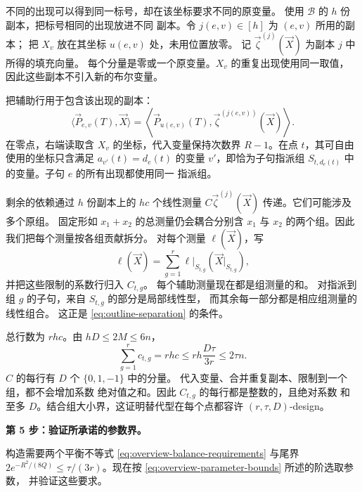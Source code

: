 \documentclass[11pt,reqno]{amsart}
\numberwithin{equation}{section}
\theoremstyle{definition}\newtheorem{definition}[theorem]{定义}
\theoremstyle{remark}\newtheorem{remark}[theorem]{注}
\renewcommand{\le}{\leqslant}
\begin{document}
不同的出现可以得到同一标号，却在该坐标要求不同的原变量。
使用 $\mathcal B$ 的 $h$ 份副本，把标号相同的出现放进不同
副本。令 $j(e,v)\in[h]$ 为 $(e,v)$ 所用的副本；
把 $X_v$ 放在其坐标 $u(e,v)$ 处，未用位置放零。
记 $\vec\zeta^{(j)}(\vec X)$ 为副本 $j$ 中所得的填充向量。
每个分量是零或一个原变量。$X_v$ 的重复出现使用同一取值，
因此这些副本不引入新的布尔变量。

把辅助行用于包含该出现的副本：
\begin{equation}\label{eq:overview-transferred-row}
 \langle\vec P_{e,v}(T),\vec X\rangle
 =\left\langle\vec P_{u(e,v)}(T),
                  \vec\zeta^{(j(e,v))}(\vec X)\right\rangle.
\end{equation}
在零点，右端读取含 $X_v$ 的坐标，代入变量保持次数界
$R-1$。在点 $t$，其可自由使用的坐标只含满足
$a_{v'}(t)=d_e(t)$ 的变量 $v'$，即恰为子句指派组
$S_{t,d_e(t)}$ 中的变量。子句 $e$ 的所有出现都使用同一
指派组。

剩余的依赖通过 $h$ 份副本上的 $hc$ 个线性测量
$C\vec\zeta^{(j)}(\vec X)$ 传递。它们可能涉及多个原组。
固定形如 $x_1+x_2$ 的总测量仍会耦合分别含 $x_1$ 与 $x_2$
的两个组。因此我们把每个测量按各组贡献拆分。
对每个测量 $\ell(\vec X)$，写
\[
 \ell(\vec X)=\sum_{g=1}^r
        \ell|_{S_{t,g}}(\vec X|_{S_{t,g}}),
\]
并把这些限制的系数行归入 $C_{t,g}$。
每个辅助测量现在都是组测量的和。
对指派到组 $g$ 的子句，来自 $S_{t,g}$ 的部分是局部线性型，
而其余每一部分都是相应组测量的线性组合。
这正是 \eqref{eq:outline-separation} 的条件。

总行数为 $rhc$。由 $hD\le2M\le6n$，
\[
 \sum_{g=1}^r c_{t,g}
 =rhc\le rh\frac{D\tau}{3r}\le2\tau n.
\]
$C$ 的每行有 $D$ 个 $\{0,1,-1\}$ 中的分量。
代入变量、合并重复副本、限制到一个组，都不会增加系数
绝对值之和。因此 $C_{t,g}$ 的每行都是整数的，且绝对系数
和至多 $D$。结合组大小界，这证明替代型在每个点都容许
$(r,\tau,D)$-design。

\medskip\noindent
\textbf{第 5 步：验证所承诺的参数界。}\par\nobreak
\smallskip\noindent
构造需要两个平衡不等式
\eqref{eq:overview-balance-requirements} 与尾界
$2e^{-R^2/(8Q)}\le\tau/(3r)$。现在按
\eqref{eq:overview-parameter-bounds} 所述的阶选取参数，
并验证这些要求。
\end{document}
